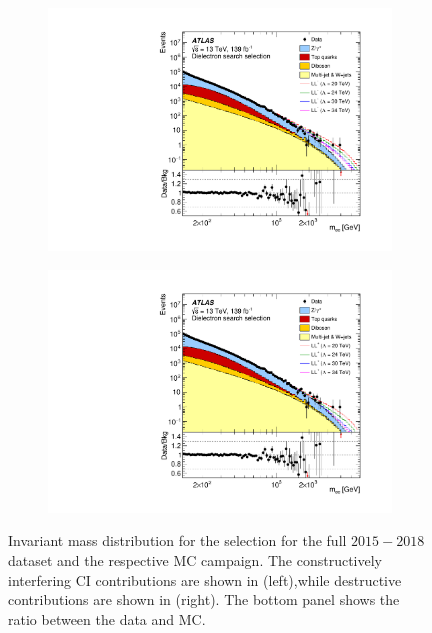 \begin{figure}[]
    \centering
    \begin{subfigure}[b]{0.49\textwidth}
        \centering
        \includegraphics[width=\textwidth]{figures/analysis/datamc/dataMCcompare/figaux_01a.pdf}
        \label{fig:datamc:eeconst}
    \end{subfigure}
    \begin{subfigure}[b]{0.49\textwidth}
        \centering
        \includegraphics[width=\textwidth]{figures/analysis/datamc/dataMCcompare/figaux_01b.pdf}
        \label{fig:datamc:eedest}
    \end{subfigure}
    \caption[Invariant mass distributions for \ee channel]{Invariant mass distribution for the \ee selection for the full $2015-2018$ dataset and the respective MC campaign. The constructively interfering CI contributions are shown in (left),while destructive contributions are shown in (right). The bottom panel shows the ratio between the data and MC.}
    \label{fig:datamc:eecompare}
\end{figure}

